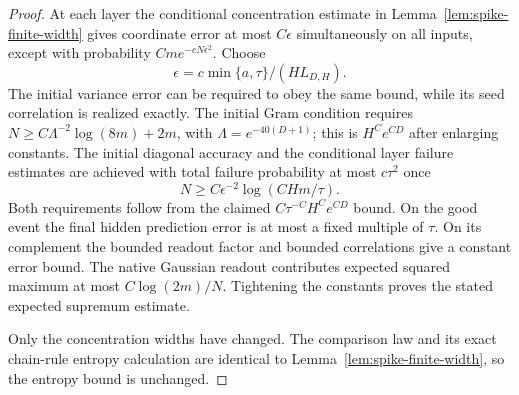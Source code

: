 \begin{proof}
At each layer the conditional concentration estimate in Lemma~\ref{lem:spike-finite-width} gives coordinate error at most $C\epsilon$ simultaneously on all inputs, except with probability $Cm e^{-cN\epsilon^2}$. Choose
\[
 \epsilon=c\min\{a,\tau\}/(H L_{D,H}).
\]
The initial variance error can be required to obey the same bound, while its seed correlation is realized exactly. The initial Gram condition requires
$N\ge C\Lambda^{-2}\log(8m)+2m$, with $\Lambda=e^{-40(D+1)}$; this is $H^C e^{CD}$ after enlarging constants. The initial diagonal accuracy and the conditional layer failure estimates are achieved with total failure probability at most $c\tau^2$ once
\[
 N\ge C\epsilon^{-2}\log(C Hm/\tau).
\]
Both requirements follow from the claimed $C\tau^{-C}H^Ce^{CD}$ bound. On the good event the final hidden prediction error is at most a fixed multiple of $\tau$. On its complement the bounded readout factor and bounded correlations give a constant error bound. The native Gaussian readout contributes expected squared maximum at most $C\log(2m)/N$. Tightening the constants proves the stated expected supremum estimate.

Only the concentration widths have changed. The comparison law and its exact chain-rule entropy calculation are identical to Lemma~\ref{lem:spike-finite-width}, so the entropy bound is unchanged.
\end{proof}
